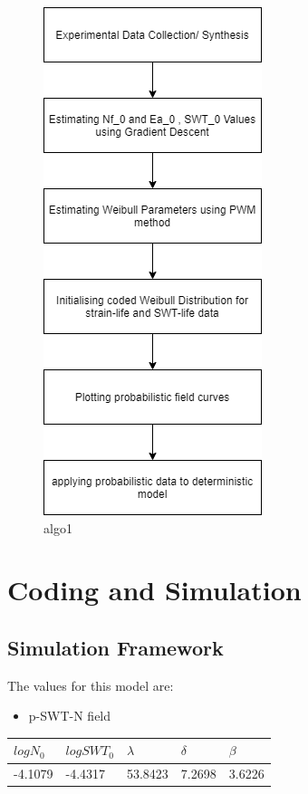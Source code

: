 \documentclass[11pt]{article}
\providecommand{\tightlist}{%
      \setlength{\itemsep}{0pt}\setlength{\parskip}{0pt}}
\begin{document}
\begin{figure}
\centering
\includegraphics{images/algo1.png}
\caption{algo1}
\end{figure}

\hypertarget{coding-and-simulation}{%
\section{Coding and Simulation}\label{coding-and-simulation}}

\hypertarget{simulation-framework}{%
\subsection{Simulation Framework}\label{simulation-framework}}

The values for this model are:

\begin{itemize}
\tightlist
\item
  p-SWT-N field
\end{itemize}

\begin{longtable}[]{@{}lllll@{}}
\toprule
\(logN_0\) & \(logSWT_0\) & \(\lambda\) & \(\delta\) &
\(\beta\)\tabularnewline
\midrule
\endhead
-4.1079 & -4.4317 & 53.8423 & 7.2698 & 3.6226\tabularnewline
\bottomrule
\end{longtable}
\end{document}
